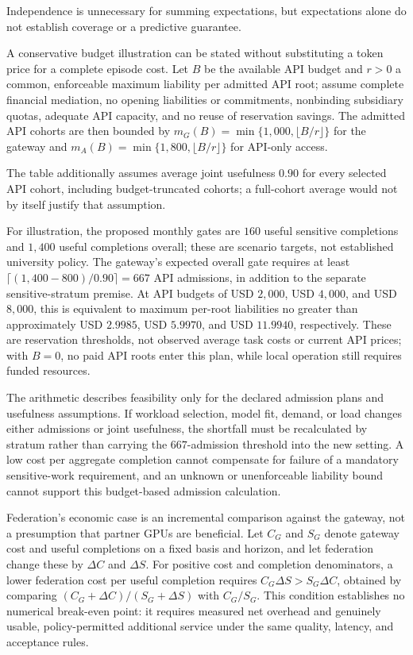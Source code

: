 \documentclass[11pt]{article}
\begin{document}
Independence is unnecessary for summing expectations, but expectations alone do not establish coverage or a predictive guarantee.

A conservative budget illustration can be stated without substituting a token price for a complete episode cost. Let $B$ be the available API budget and $r>0$ a common, enforceable maximum liability per admitted API root; assume complete financial mediation, no opening liabilities or commitments, nonbinding subsidiary quotas, adequate API capacity, and no reuse of reservation savings. The admitted API cohorts are then bounded by $m_G(B)=\min\{1{,}000,\lfloor B/r\rfloor\}$ for the gateway and $m_A(B)=\min\{1{,}800,\lfloor B/r\rfloor\}$ for API-only access.

The table additionally assumes average joint usefulness $0.90$ for every selected API cohort, including budget-truncated cohorts; a full-cohort average would not by itself justify that assumption.

For illustration, the proposed monthly gates are $160$ useful sensitive completions and $1{,}400$ useful completions overall; these are scenario targets, not established university policy. The gateway's expected overall gate requires at least $\lceil(1{,}400-800)/0.90\rceil=667$ API admissions, in addition to the separate sensitive-stratum premise. At API budgets of USD $2{,}000$, USD $4{,}000$, and USD $8{,}000$, this is equivalent to maximum per-root liabilities no greater than approximately USD $2.9985$, USD $5.9970$, and USD $11.9940$, respectively. These are reservation thresholds, not observed average task costs or current API prices; with $B=0$, no paid API roots enter this plan, while local operation still requires funded resources.

The arithmetic describes feasibility only for the declared admission plans and usefulness assumptions. If workload selection, model fit, demand, or load changes either admissions or joint usefulness, the shortfall must be recalculated by stratum rather than carrying the $667$-admission threshold into the new setting. A low cost per aggregate completion cannot compensate for failure of a mandatory sensitive-work requirement, and an unknown or unenforceable liability bound cannot support this budget-based admission calculation.

Federation's economic case is an incremental comparison against the gateway, not a presumption that partner GPUs are beneficial. Let $C_G$ and $S_G$ denote gateway cost and useful completions on a fixed basis and horizon, and let federation change these by $\Delta C$ and $\Delta S$. For positive cost and completion denominators, a lower federation cost per useful completion requires $C_G\Delta S>S_G\Delta C$, obtained by comparing $(C_G+\Delta C)/(S_G+\Delta S)$ with $C_G/S_G$. This condition establishes no numerical break-even point: it requires measured net overhead and genuinely usable, policy-permitted additional service under the same quality, latency, and acceptance rules.
\end{document}
